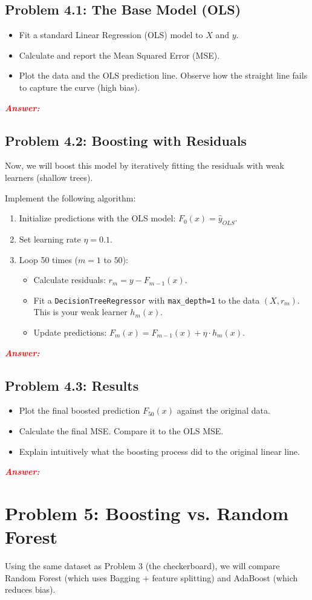 \documentclass[11pt, letterpaper]{article}
\newcommand{\problem}[1]{\section*{Problem #1}}
\newcommand{\subproblem}[1]{\subsection*{Problem #1}}
\newcommand{\answer}{\textbf{\textit{\textcolor{red}{Answer:}}}}
\begin{document}
\subproblem{4.1: The Base Model (OLS)}
\begin{itemize}
    \item Fit a standard Linear Regression (OLS) model to $X$ and $y$.
    \item Calculate and report the Mean Squared Error (MSE).
    \item Plot the data and the OLS prediction line. Observe how the straight line fails to capture the curve (high bias).
\end{itemize}

\answer

\subproblem{4.2: Boosting with Residuals}
Now, we will boost this model by iteratively fitting the residuals with weak learners (shallow trees).

Implement the following algorithm:
\begin{enumerate}
    \item Initialize predictions with the OLS model: $F_0(x) = \hat{y}_{OLS}$.
    \item Set learning rate $\eta = 0.1$.
    \item Loop 50 times ($m=1$ to $50$):
    \begin{itemize}
        \item Calculate residuals: $r_m = y - F_{m-1}(x)$.
        \item Fit a \texttt{DecisionTreeRegressor} with \texttt{max\_depth=1} to the data $(X, r_m)$. This is your weak learner $h_m(x)$.
        \item Update predictions: $F_m(x) = F_{m-1}(x) + \eta \cdot h_m(x)$.
    \end{itemize}
\end{enumerate}

\answer

\subproblem{4.3: Results}
\begin{itemize}
    \item Plot the final boosted prediction $F_{50}(x)$ against the original data.
    \item Calculate the final MSE. Compare it to the OLS MSE.
    \item Explain intuitively what the boosting process did to the original linear line.
\end{itemize}

\answer

\problem{5: Boosting vs. Random Forest}

Using the same dataset as Problem 3 (the checkerboard), we will compare Random Forest (which uses Bagging + feature splitting) and AdaBoost (which reduces bias).
\end{document}
